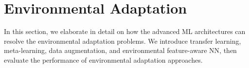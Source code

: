 \documentclass[lettersize,journal]{IEEEtran}
\begin{document}

\section{Environmental Adaptation}\label{Section4}
In this section, we elaborate in detail on how the advanced ML architectures can resolve the environmental adaptation problems. We introduce transfer learning, meta-learning, data augmentation, and environmental feature-aware NN, then evaluate the performance of environmental adaptation approaches. %
\end{document}
